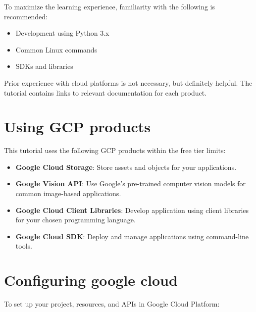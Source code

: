 \documentclass{article}
\begin{document}
To maximize the learning experience, familiarity with the following is recommended:

\begin{itemize}
    \item Development using Python 3.x
    \item Common Linux commands
    \item SDKs and libraries
\end{itemize}

Prior experience with cloud platforms is not necessary, but definitely helpful. The tutorial contains links to relevant documentation for each product.

\section*{Using GCP products}

This tutorial uses the following GCP products within the free tier limits:

\begin{itemize}
    \item \textbf{Google Cloud Storage}: Store assets and objects for your applications.
    
    \item \textbf{Google Vision API}: Use Google's pre-trained computer vision models for common image-based applications.
    
    \item \textbf{Google Cloud Client Libraries}: Develop application using client libraries for your chosen programming language.
    
    \item \textbf{Google Cloud SDK}: Deploy and manage applications using command-line tools.
\end{itemize}

\section*{Configuring google cloud}

To set up your project, resources, and APIs in Google Cloud Platform:
\end{document}
